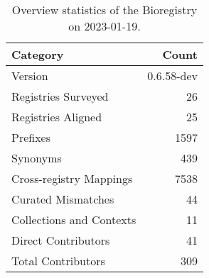 \begin{table}
\centering
\caption{Overview statistics of the Bioregistry on 2023-01-19.}
\label{tab:bioregistry-summary}
\begin{tabular}{lr}
\toprule
                Category &      Count \\
\midrule
                 Version & 0.6.58-dev \\
     Registries Surveyed &         26 \\
      Registries Aligned &         25 \\
                Prefixes &       1597 \\
                Synonyms &        439 \\
 Cross-registry Mappings &       7538 \\
      Curated Mismatches &         44 \\
Collections and Contexts &         11 \\
     Direct Contributors &         41 \\
      Total Contributors &        309 \\
\bottomrule
\end{tabular}
\end{table}
